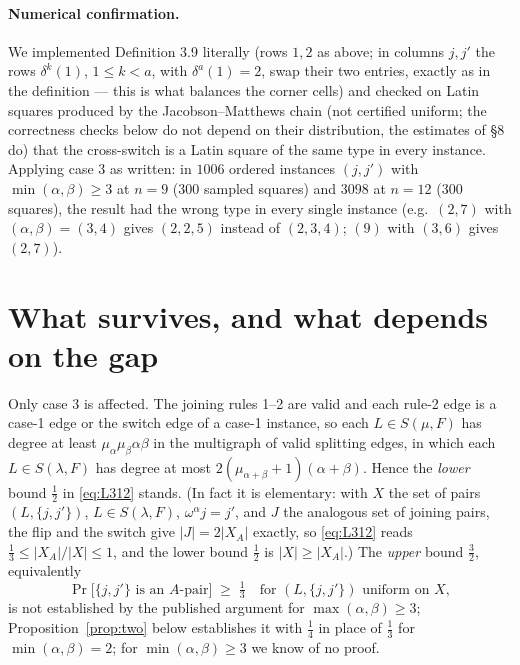 \documentclass[11pt]{article}
\theoremstyle{remark}
\begin{document}
\paragraph{Numerical confirmation.}  We implemented Definition 3.9
literally (rows $1,2$ as above; in columns $j,j'$ the rows
$\delta^k(1)$, $1\le k<a$, with $\delta^a(1)=2$, swap their two entries,
exactly as in the definition --- this is what balances the corner
cells) and checked on Latin squares produced by the Jacobson--Matthews chain
\cite{JM96} (not certified uniform; the correctness checks below do
not depend on their distribution, the estimates of \S8 do) that the cross-switch is a Latin square of the same type
in every instance.  Applying case 3 as written:
in $1006$ ordered instances $(j,j')$ with $\min(\alpha,\beta)\ge3$ at
$n=9$ ($300$ sampled squares) and $3098$ at $n=12$ ($300$ squares),
the result had the wrong type in every single instance (e.g.\ $(2,7)$
with $(\alpha,\beta)=(3,4)$ gives $(2,2,5)$ instead of $(2,3,4)$; $(9)$
with $(3,6)$ gives $(2,7)$).

\section{What survives, and what depends on the gap}

Only case 3 is affected.  The joining rules 1--2 are valid and each
rule-2 edge is a case-1 edge or the switch edge of a case-1 instance,
so each $L\in S(\mu,F)$ has degree at least
$\mu_\alpha\mu_\beta\alpha\beta$ in the multigraph of valid splitting
edges, in which each $L\in S(\lambda,F)$ has degree at most
$2(\mu_{\alpha+\beta}+1)(\alpha+\beta)$.  Hence the \emph{lower} bound
$\frac12$ in \eqref{eq:L312} stands.  (In fact it is elementary: with
$X$ the set of pairs $(L,\{j,j'\})$, $L\in S(\lambda,F)$,
$\omega^\alpha j=j'$, and $J$ the analogous set of joining pairs, the
flip and the switch give $|J|=2|X_A|$ exactly, so \eqref{eq:L312}
reads $\frac13\le|X_A|/|X|\le1$, and the lower bound $\frac12$ is
$|X|\ge|X_A|$.)  The \emph{upper} bound $\frac32$, equivalently
\[
\Pr\bigl[\{j,j'\}\text{ is an $A$-pair}\bigr]\;\ge\;\tfrac13
\quad\text{for $(L,\{j,j'\})$ uniform on $X$},
\]
is not established by the published argument for $\max(\alpha,\beta)\ge3$;
Proposition~\ref{prop:two} below establishes it with $\tfrac14$ in place of $\tfrac13$
for $\min(\alpha,\beta)=2$; for $\min(\alpha,\beta)\ge3$ we know of no
proof.
\end{document}
